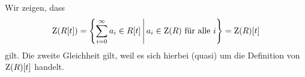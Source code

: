 




\subsection{}

Wir zeigen, dass
\[
    \operatorname{Z}( R[t] )
  = \left\{
      \sum_{i=0}^\infty a_i \in R[t]
    \,\middle\vert\,
      \text{$a_i \in \operatorname{Z}(R)$ für alle $i$}
    \right\}
  = \operatorname{Z}(R) [t]
\]
gilt.
Die zweite Gleichheit gilt, weil es sich hierbei (quasi) um die Definition von $\operatorname{Z}(R) [t]$ handelt.
























